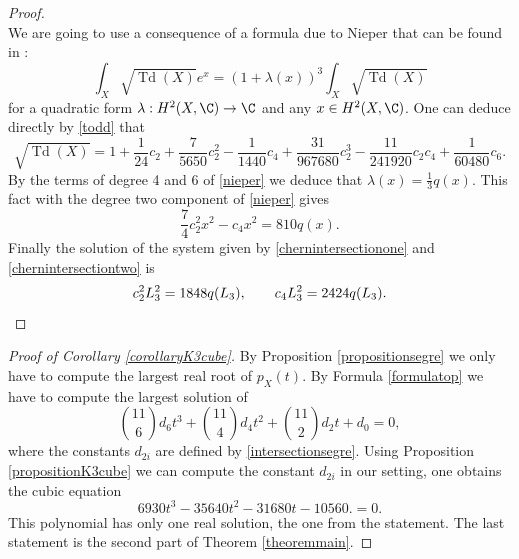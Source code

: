\documentclass[JEP,XML,SOM,Unicode,NoEqCountersInSection,published]{cedram}
\theoremstyle{plain}
\theoremstyle{definition}
\DeclareMathOperator{\Td}{Td}
\begin{document}
\begin{proof}
\begin{equation}
\end{equation}
We are going to use a consequence of a formula due to Nieper that can be found in \cite[Th.\,4.2]{Huy03b}:\vspace*{-3pt}
\begin{equation}\label{nieper}
\int_X\sqrt{\Td(X)}e^x=(1+\lambda(x))^3\int_X\sqrt{\Td(X)}
\end{equation}
for a quadratic form $\lambda:H^2(X,\C)\to\C$ and any $x\in H^2(X,\C)$.
One can deduce directly by \eqref{todd} that\vspace*{-3pt}
\[\sqrt{\Td(X)}=1+\frac{1}{24}c_2+\frac{7}{5650}c_2^2-\frac{1}{1440}c_4+\frac{31}{967680}c_2^3-\frac{11}{241920}c_2c_4+\frac{1}{60480}c_6.\]
By the terms of degree 4 and 6 of \eqref{nieper} we deduce that $\lambda(x)=\frac{1}{3}q(x)$. This fact with the degree two component of \eqref{nieper} gives
\begin{equation}\label{chernintersectiontwo}
\frac{7}{4}c_2^2x^2-c_4x^2=810 q(x).
\end{equation}
Finally the solution of the system given by \eqref{chernintersectionone} and \eqref{chernintersectiontwo} is
\[
c_2^2 L_3^2=1848 q(L_3), \qquad
c_4 L_3^2=2424 q(L_3).\qedhere
\]
\end{proof}

\begin{proof}[Proof of Corollary \ref{corollaryK3cube}]
By Proposition \ref{propositionsegre} we only have to compute the
largest real root of $p_X(t)$.
By Formula \eqref{formulatop}
we have to compute the largest solution of
\[
\binom{11}{6} d_6 t^3 + \binom{11}{4} d_4 t^2 + \binom{11}{2} d_2 t + d_0 = 0,
\]
where the constants $d_{2i}$ are defined by \eqref{intersectionsegre}.
Using Proposition \ref{propositionK3cube} we can compute the constant $d_{2i}$ in our setting,
one obtains the cubic equation
\[
6930 t^3-35640 t^2-31680 t-10560. = 0.
\]
This polynomial has only one real solution, the one from the statement.
The last statement is the second part of Theorem \ref{theoremmain}.
\end{proof}
\end{document}
